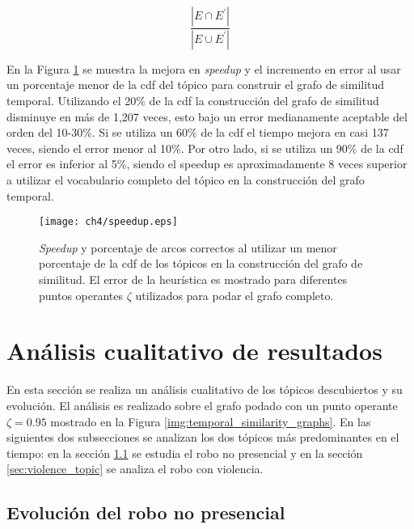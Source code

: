 \begin{equation}
  \frac{|E\cap E^{'}|}{|E\cup E^{'}|}
\end{equation}

En la Figura \ref{img:speedup} se muestra la mejora en \textit{speedup} y el incremento en error al usar un porcentaje menor de la cdf del tópico para construir el grafo de similitud temporal. Utilizando el 20\% de la cdf la construcción del grafo de similitud disminuye en más de 1,207 veces, esto bajo un error medianamente aceptable del orden del 10-30\%. Si se utiliza un 60\% de la cdf el tiempo mejora en casi 137 veces, siendo el error menor al 10\%. Por otro lado, si se utiliza un 90\% de la cdf el error es inferior al 5\%, siendo el speedup es aproximadamente 8 veces superior a utilizar el vocabulario completo del tópico en la construcción del grafo temporal.

\begin{figure}
    \centering
    \texttt{[image: ch4/speedup.eps]}
    \caption{\textit{Speedup} y porcentaje de arcos correctos al utilizar un menor porcentaje de la cdf de los tópicos en la construcción del grafo de similitud. El error de la heurística es mostrado para diferentes puntos operantes $\zeta$ utilizados para podar el grafo completo.} 
    \label{img:speedup}
\end{figure}


\section{Análisis cualitativo de resultados}
\label{sec:qualitative}

En esta sección se realiza un análisis cualitativo de los tópicos descubiertos y su evolución. El análisis es realizado sobre el grafo podado con un punto operante $\zeta = 0.95$ mostrado en la Figura \ref{img:temporal_similarity_graphs}. En las siguientes dos subsecciones se analizan los dos tópicos más predominantes en el tiempo: en la sección \ref{sec:noviolence_topic} se estudia el robo no presencial y en la sección \ref{sec:violence_topic} se analiza el robo con violencia.

\subsection{Evolución del robo no presencial}
\label{sec:noviolence_topic}

